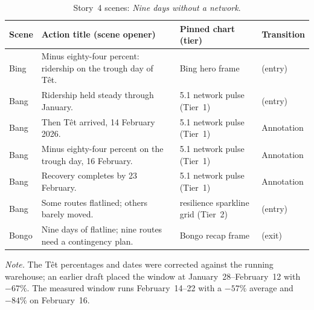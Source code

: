 \begin{table}[!htbp]
\centering
\caption{Story~4 scenes: \textit{Nine days without a network}.}
\label{tab:themes:story_tet}
\footnotesize
\begin{tabularx}{\linewidth}{p{0.8cm}Xp{2.7cm}p{1.6cm}}
\hline
\textbf{Scene} & \textbf{Action title (scene opener)} & \textbf{Pinned chart (tier)} & \textbf{Transition} \\
\hline
Bing  & Minus eighty-four percent: ridership on the trough day of T\^et.                & Bing hero frame                          & (entry)    \\
Bang  & Ridership held steady through January.                                         & 5.1 network pulse (Tier~1)               & (entry)    \\
Bang  & Then T\^et arrived, 14 February 2026.                                          & 5.1 network pulse (Tier~1)               & Annotation \\
Bang  & Minus eighty-four percent on the trough day, 16 February.                      & 5.1 network pulse (Tier~1)               & Annotation \\
Bang  & Recovery completes by 23 February.                                            & 5.1 network pulse (Tier~1)               & Annotation \\
Bang  & Some routes flatlined; others barely moved.                                    & resilience sparkline grid (Tier~2)       & (entry)    \\
Bongo & Nine days of flatline; nine routes need a contingency plan.                    & Bongo recap frame                        & (exit)     \\
\hline
\end{tabularx}
\par\smallskip
\footnotesize\textit{Note.} The T\^et percentages and dates were corrected
against the running warehouse; an earlier draft placed the window at
January~28--February~12 with $-67\%$. The measured window runs
February~14--22 with a $-57\%$ average and $-84\%$ on February~16.
\end{table}
